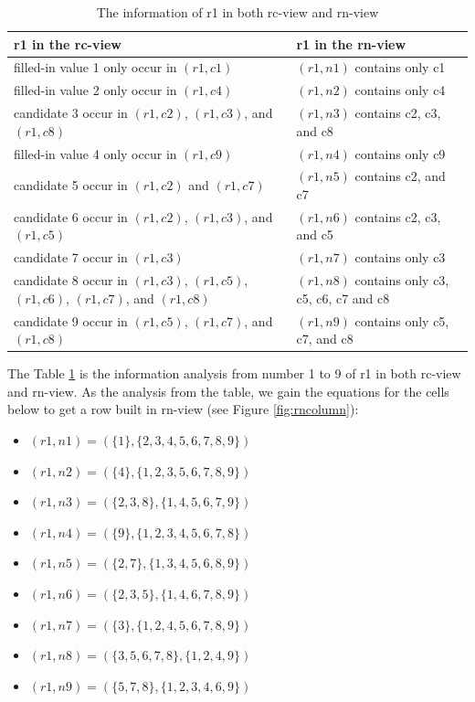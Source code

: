 \documentclass[11pt]{report}
\newcommand{\set}[1]{\{ #1 \}}
\begin{document}
\begin{table}
\begin{center}
  \begin{tabular}{|p{7cm}|p{7cm}|}
    \hline
    \textbf{r1 in the rc-view} & \textbf{r1 in the rn-view} \\ \hline
    filled-in value 1 only occur in $(r1,c1)$ & $(r1,n1)$ contains only c1\\ \hline
    filled-in value 2 only occur in $(r1,c4)$ & $(r1,n2)$ contains only c4 \\ \hline
    candidate 3 occur in $(r1,c2)$,  $(r1,c3)$, and $(r1,c8)$ & $(r1,n3)$ contains c2, c3, and c8 \\ \hline
    filled-in value 4 only occur in $(r1,c9)$ & $(r1,n4)$ contains only c9 \\ \hline
    candidate 5 occur in $(r1,c2)$ and $(r1,c7)$ & $(r1,n5)$ contains c2, and c7 \\ \hline
    candidate 6 occur in $(r1,c2)$,  $(r1,c3)$, and $(r1,c5)$ & $(r1,n6)$ contains c2, c3, and c5 \\ \hline
    candidate 7 occur in $(r1,c3)$ & $(r1,n7)$ contains only c3 \\ \hline
    candidate 8 occur in $(r1,c3)$,  $(r1,c5)$,  $(r1,c6)$,  $(r1,c7)$, and $(r1,c8)$ & $(r1,n8)$ contains only c3, c5, c6, c7 and c8 \\ \hline
    candidate 9 occur in $(r1,c5)$, $(r1,c7)$, and  $(r1,c8)$ & $(r1,n9)$ contains only c5, c7, and c8 \\ \hline
  \end{tabular}
\end{center}
\caption{The information of r1 in both rc-view and rn-view}
\label{tab:rcandrn}
\end{table}

The Table \ref{tab:rcandrn} is the information analysis from number 1 to 9 of r1 in both rc-view and rn-view. As the analysis from the table, we gain the equations for the cells below to get a row built in rn-view (see Figure \ref{fig:rncolumn}):
\begin{itemize}
\item $(r1,n1)=(\set{1}, \set{2, 3, 4, 5, 6, 7, 8, 9})$
\item $(r1,n2)=(\set{4}, \set{1, 2, 3, 5, 6, 7, 8, 9})$
\item $(r1,n3)=(\set{2, 3, 8}, \set{1, 4, 5, 6, 7, 9})$
\item $(r1,n4)=(\set{9}, \set{1, 2, 3, 4, 5, 6, 7, 8})$
\item $(r1,n5)=(\set{2, 7}, \set{1, 3, 4, 5, 6, 8, 9})$
\item $(r1,n6)=(\set{2, 3, 5}, \set{1, 4, 6, 7, 8, 9})$
\item $(r1,n7)=(\set{3}, \set{1, 2, 4, 5, 6, 7, 8, 9})$
\item $(r1,n8)=(\set{3, 5, 6, 7, 8}, \set{1, 2, 4, 9})$
\item $(r1,n9)=(\set{5, 7, 8}, \set{1, 2, 3, 4, 6, 9})$
\end{itemize}
\end{document}
